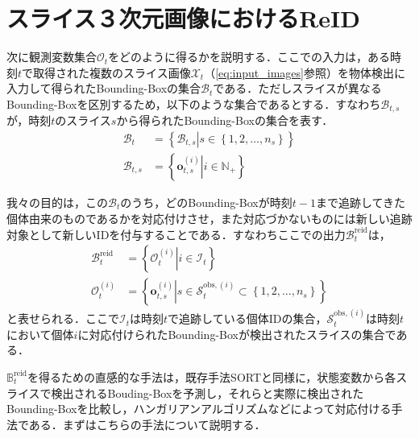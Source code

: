 \section{スライス３次元画像におけるReID}
次に観測変数集合$\mathcal{O}_t$をどのように得るかを説明する．ここでの入力は，ある時刻$t$で取得された複数のスライス画像$\mathcal{X}_t$（\ref{eq:input_images}参照）を物体検出に入力して得られたBounding-Boxの集合$\mathcal{B}_t$である．ただしスライスが異なるBounding-Boxを区別するため，以下のような集合であるとする．すなわち$\mathcal{B}_{t,s}$が，時刻$t$のスライス$s$から得られたBounding-Boxの集合を表す．
\begin{equation}
    \begin{aligned}
        \mathcal{B}_t &= \left\{\left.\mathcal{B}_{t,s}\right|s \in \left\{1,2,\dots,n_s\right\}\right\}
        \\\mathcal{B}_{t,s} &= \left\{\left.\bm{o}_{t,s}^{(i)}\right|i \in \mathbb{N}_{+}\right\}
    \end{aligned}
\end{equation}

我々の目的は，この$\mathcal{B}_t$のうち，どのBounding-Boxが時刻$t-1$まで追跡してきた個体由来のものであるかを対応付けさせ，また対応づかないものには新しい追跡対象として新しいIDを付与することである．すなわちここでの出力$\mathcal{B}_t^{\text{reid}}$は，
\begin{equation}
    \begin{aligned}
        \mathcal{B}_t^{\text{reid}} &= \left\{\left.\mathcal{O}_t^{(i)}\right| i \in \mathcal{I}_t\right\}
        \\ \mathcal{O}_t^{(i)} &= \left\{\left.\bm{o}_{t,s}^{(i)}\right| s \in \mathcal{S}_t^{\text{obs},(i)} \subset \left\{1,2,\dots,n_s\right\}\right\}
    \end{aligned}
\end{equation}
と表せられる．ここで$\mathcal{I}_t$は時刻$t$で追跡している個体IDの集合，$\mathcal{S}_t^{\text{obs},(i)}$は時刻$t$において個体$i$に対応付けられたBounding-Boxが検出されたスライスの集合である．
\par
$\mathbb{B}_t^{\text{reid}}$を得るための直感的な手法は，既存手法SORTと同様に，状態変数から各スライスで検出されるBouding-Boxを予測し，それらと実際に検出されたBounding-Boxを比較し，ハンガリアンアルゴリズムなどによって対応付ける手法である．まずはこちらの手法について説明する．

